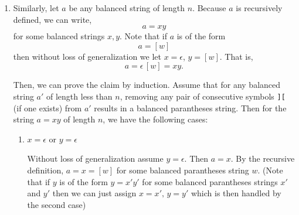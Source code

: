\documentclass[12pt]{article}
\begin{document}
\begin{solution}
\begin{enumerate}
\begin{enumerate}
            \item Neither $x$ nor $y$ is empty. 
            
            Then, 
            \[a = xy\]
            where both $x$ and $y$ are balanced parantheses strings of length less than $n$. Since, $x, y$ are balanced parantheses strings, we know that for each of them the first character is \texttt{[} and the last character is \texttt{]}. So, the sequence \texttt{[]} doesn't appear at the junction between $x$ and $y$. Hence, we know that if the pair of consecutive symbols \texttt{[]} exists, it exists inside $x$ or $y$. 

            Since both $x,y$ are balanced parantheses strings of length less than $n$, by the induction hypothesis we know that that removing any pair of consecutive symbols \texttt{[]} (if one exists) from $x, y$ results in balanced parantheses strings. And, since composition of balanced proposition strings is a balanced proposition string, the induction holds. 

            \item $x = y = \epsilon, \, w = \epsilon$
            
            This case is vacuously true because there exist no consecutive symbols \texttt{[]}. 
        \end{enumerate}

        \item Similarly, let $a$ be any balanced string of length $n$. Because $a$ is recursively defined, we can write, 
        \[a = xy\]
        for some balanced strings $x, y$. Note that if $a$ is of the form 
        \[a =[w]\]
        then without loss of generalization we let $x = \epsilon$, $y = [w]$. That is, 
        \[a = \epsilon \, [w] = xy.\]

        Then, we can prove the claim by induction. Assume that for any balanced string $a'$ of length less than $n$, removing any pair of consecutive symbols \texttt{][} (if one exists) from $a'$ results in a balanced parantheses string. Then for the string $a = xy$ of length $n$, we have the following cases: 

        \begin{enumerate}
            \item $x = \epsilon$ or $y = \epsilon$
            
            Without loss of generalization assume $y = \epsilon$. Then $a = x$. By the recursive definition, $a = x = [w]$ for some balanced parantheses string $w$. (Note that if $y$ is of the form $ y = x'y'$ for some balanced parantheses strings $x'$ and $y'$ then we can just assign $x = x', \, y = y'$ which is then handled by the second case) 
            

\end{enumerate}
\end{enumerate}
\end{solution}
\end{document}
